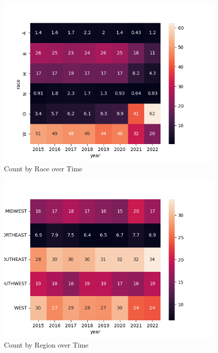 \documentclass[12pt]{article}
\begin{document}
\begin{enumerate}[leftmargin=\labelsep]
  \begin{figure}[htb]
    \begin{center}
      \includegraphics[width=\textwidth]{media/Count_by_Race_over_Time.png}
    \end{center}
    \caption{Count by Race over Time}
    \label{fig:p2_count_by_race_time}
  \end{figure}

  \begin{figure}[htb]
    \begin{center}
      \includegraphics[width=\textwidth]{media/Count_by_Region_over_Time.png}
    \end{center}
    \caption{Count by Region over Time}
    \label{fig:p2_count_by_region_time}
  \end{figure}


\end{enumerate}
\end{document}
